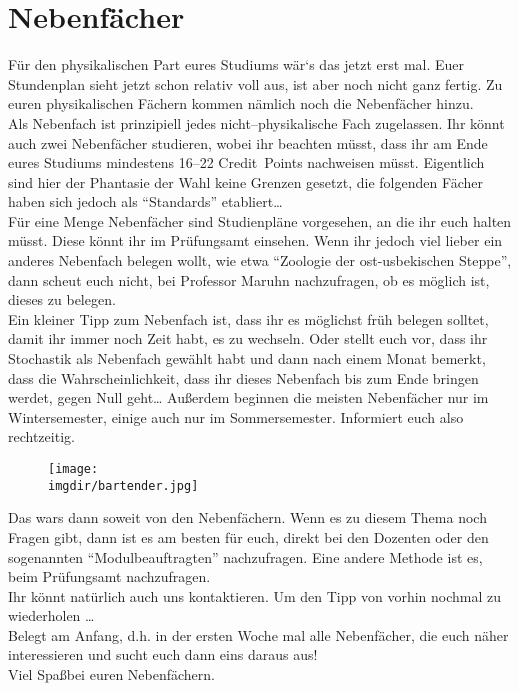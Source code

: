 \section{Nebenfächer}
\label{sec:nebenfach}
Für den physikalischen Part eures Studiums wär`s das jetzt erst mal. Euer Stundenplan sieht jetzt schon relativ voll aus, ist aber noch nicht ganz fertig. Zu euren physikalischen Fächern kommen nämlich noch die Nebenfächer hinzu.\\
Als Nebenfach ist prinzipiell jedes nicht--physikalische Fach zugelassen. Ihr könnt auch zwei Nebenfächer studieren, wobei ihr beachten müsst, dass ihr am Ende eures Studiums mindestens 16--22 Credit~Points nachweisen müsst. Eigentlich sind hier der Phantasie der Wahl keine Grenzen gesetzt, die folgenden Fächer haben sich jedoch als \enquote{Standards} etabliert\ldots{}\\
Für eine Menge Nebenfächer sind Studienpläne vorgesehen, an die ihr euch halten müsst. Diese könnt ihr im Prüfungsamt einsehen. Wenn ihr jedoch viel lieber ein anderes Nebenfach belegen wollt, wie etwa \enquote{Zoologie der ost-usbekischen Steppe}, dann scheut euch nicht, bei Professor Maruhn nachzufragen, ob es möglich ist, dieses zu belegen.\\
Ein kleiner Tipp zum Nebenfach ist, dass ihr es möglichst früh belegen solltet, damit ihr immer noch Zeit habt, es zu wechseln. Oder stellt euch vor, dass ihr Stochastik als Nebenfach gewählt habt und dann nach einem Monat bemerkt, dass die Wahrscheinlichkeit, dass ihr dieses Nebenfach bis zum Ende bringen werdet, gegen Null geht\ldots{} Außerdem beginnen die meisten Nebenfächer nur im Wintersemester, einige auch nur im Sommersemester. Informiert euch also rechtzeitig.
\begin{figure}
	\centering
	\texttt{[image: \\imgdir/bartender.jpg]}
\end{figure}
\newpage









\bigskip
Das wars dann soweit von den Nebenfächern. Wenn es zu diesem Thema noch Fragen gibt, dann ist es am besten für euch, direkt bei den Dozenten oder den sogenannten \enquote{Modulbeauftragten} nachzufragen. Eine andere Methode ist es, beim Prüfungsamt nachzufragen.\\
Ihr könnt natürlich auch uns kontaktieren. Um den Tipp von vorhin nochmal zu wiederholen \ldots\\
Belegt am Anfang, d.h. in der ersten Woche mal alle Nebenfächer, die euch näher interessieren und sucht euch dann eins daraus aus!\\
Viel Spa\ss\space bei euren Nebenfächern.
